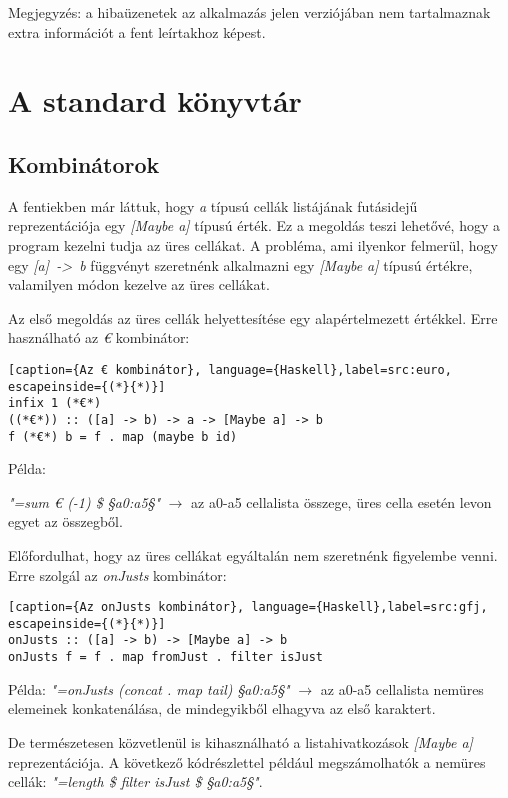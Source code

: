 Megjegyzés: a hibaüzenetek az alkalmazás jelen verziójában nem tartalmaznak extra információt a fent leírtakhoz képest. 


\section{A standard könyvtár}

\subsection{Kombinátorok}

A fentiekben már láttuk, hogy \textit{a} típusú cellák listájának futásidejű reprezentációja egy \textit{[Maybe a]} típusú érték. Ez a megoldás teszi lehetővé, hogy a program kezelni tudja az üres cellákat. A probléma, ami ilyenkor felmerül, hogy egy \mbox{\textit{[a] -> b}} függvényt szeretnénk alkalmazni egy \textit{[Maybe a]} típusú értékre, valamilyen módon kezelve az üres cellákat.

Az első megoldás az üres cellák helyettesítése egy alapértelmezett értékkel. Erre használható az \textit{€} kombinátor:

\begin{lstlisting}[caption={Az € kombinátor}, language={Haskell},label=src:euro, escapeinside={(*}{*)}]
infix 1 (*€*)
((*€*)) :: ([a] -> b) -> a -> [Maybe a] -> b
f (*€*) b = f . map (maybe b id)
\end{lstlisting}

Példa:

\textit{"=sum € (-1) \$ §a0:a5§"} $\rightarrow$ az a0-a5 cellalista összege, üres cella esetén levon egyet az összegből.

Előfordulhat, hogy az üres cellákat egyáltalán nem szeretnénk figyelembe venni. Erre szolgál az \textit{onJusts} kombinátor:

\begin{lstlisting}[caption={Az onJusts kombinátor}, language={Haskell},label=src:gfj, escapeinside={(*}{*)}]
onJusts :: ([a] -> b) -> [Maybe a] -> b
onJusts f = f . map fromJust . filter isJust 
\end{lstlisting}

Példa:
\textit{"=onJusts (concat . map tail) §a0:a5§"} $\rightarrow$ az a0-a5 cellalista nemüres elemeinek konkatenálása, de mindegyikből elhagyva az első karaktert.

De természetesen közvetlenül is kihasználható a listahivatkozások \textit{[Maybe a]} reprezentációja. A következő kódrészlettel például megszámolhatók a nemüres cellák: \textit{"=length \$ filter isJust \$ §a0:a5§"}.

